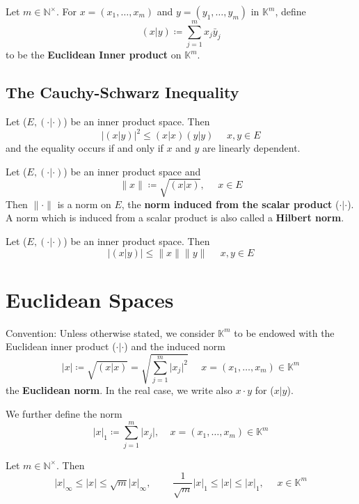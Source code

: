 Let \(m \in \mathbb{N}^\times\). For \(x = \left(x_1,\ldots,x_m\right)\) and 
\(y = \left(y_1,\ldots,y_m\right)\) in \(\mathbb{K}^m\), define
\[
    (x|y) \coloneqq \sum^m_{j=1} x_j \bar{y}_j   
\]
to be the \textbf{Euclidean Inner product} on \(\mathbb{K}^m\). 

\subsection*{The Cauchy-Schwarz Inequality}

\begin{theorem}\label{theorem: Cauchy-Schwarz}
    Let (\(E, \left(\cdot|\cdot\right)\)) be an inner product space. Then
    \[
        \lvert (x|y) \rvert^2  \leq (x|x)(y|y) \:\:\:\:\:\: x,y \in E   
    \]
    and the equality occurs if and only if \(x\) and \(y\) are linearly dependent.
\end{theorem}

\begin{theorem}
    Let (\(E, \left(\cdot|\cdot\right)\)) be an inner product space and 
    \[
        \lVert x \rVert \coloneqq \sqrt{(x|x)}, \:\:\:\:\:\: x\in E  
    \]
    Then \(\lVert \cdot \rVert\) is a norm on \(E\), the \textbf{norm induced from
    the scalar product} (\(\cdot | \cdot\)). 
    A norm which is induced from a scalar product is also called a \textbf{Hilbert norm}. 
\end{theorem}

\begin{corollary}
    Let (\(E, \left(\cdot|\cdot\right)\)) be an inner product space. Then
    \[
        \lvert (x|y) \rvert \leq \lVert x \rVert \lVert y\rVert \:\:\:\:\:\: x,y \in E
    \]
\end{corollary}

\section{Euclidean Spaces}

Convention: Unless otherwise stated, we consider \(\mathbb{K}^m\) to be endowed with 
the Euclidean inner product (\(\cdot|\cdot\)) and the induced norm
\[
    \lvert x \rvert \coloneqq \sqrt{(x|x)} = \sqrt{\sum^m_{j=1}\lvert x_j\rvert^2}
    \:\:\:\:\:\: x = (x_1,\ldots,x_m) \in \mathbb{K}^m 
\]
the \textbf{Euclidean norm}. In the real case, we write also \(x \cdot y\) for (\(x|y\)). 

We further define the norm 
\[
    \lvert x \rvert_1 \coloneqq \sum^m_{j=1} \lvert x_j \rvert , \:\:\:\:\: x = (x_1,\ldots,x_m)\in \mathbb{K}^m  
\]
\begin{proposition}
    Let \(m \in \mathbb{N}^\times\). Then 
    \[
        \lvert x \rvert_\infty \leq \lvert x \rvert \leq \sqrt{m} \lvert x \rvert_\infty
        , \:\:\:\:\:\:\:\:\:\: \frac{1}{\sqrt{m}}\lvert x \rvert_1 \leq \lvert x \rvert
        \leq \lvert x \rvert_1, \:\:\:\:\:\: x \in \mathbb{K}^m   
    \]
\end{proposition}


